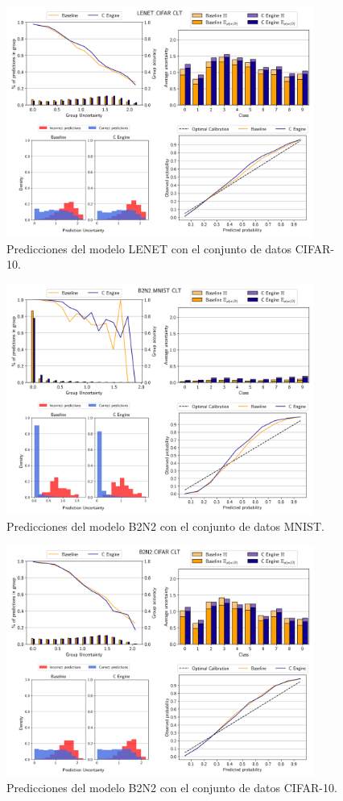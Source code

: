 \begin{figure}[ht]
    \centering
    \includegraphics[width=0.9\textwidth]{root/Imagenes/anexo/CLT-LENET_CIFAR-mosaic.png}
    \caption{Predicciones del modelo LENET con el conjunto de datos CIFAR-10.}
    \label{fig:anx-CLT-LENET_CIFAR}
\end{figure}


\begin{figure}[ht]
    \centering
    \includegraphics[width=0.9\textwidth]{root/Imagenes/anexo/CLT-B2N2_MNIST-mosaic.png}
    \caption{Predicciones del modelo B2N2 con el conjunto de datos MNIST.}
    \label{fig:anx-CLT-B2N2_MNIST}
\end{figure}


\begin{figure}[ht]
    \centering
    \includegraphics[width=0.9\textwidth]{root/Imagenes/anexo/CLT-B2N2_CIFAR-mosaic.png}
    \caption{Predicciones del modelo B2N2 con el conjunto de datos CIFAR-10.}
    \label{fig:anx-CLT-B2N2_CIFAR}
\end{figure}

